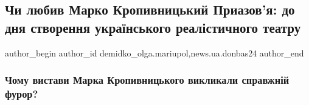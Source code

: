  
 
 
 
 
 
\subsection{Чи любив Марко Кропивницький Приазов'я: до дня створення українського реалістичного театру}
\label{sec:27_10_2022.stz.news.ua.donbas24.1.chy_ljubyv_marko_kropyvnyckyj_priazovja_stvorennja_ukr_realistic_teatr}
 
\ifcmt
 author_begin
   author_id demidko_olga.mariupol,news.ua.donbas24
 author_end
\fi





\subsubsection{Чому вистави Марка Кропивницького викликали справжній фурор?}

